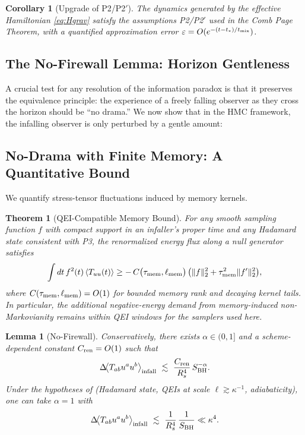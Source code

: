 \documentclass[a4paper,11pt]{article}
\newcommand{\HMC}{\textsc{HMC}\xspace}
\theoremstyle{plain}
\newtheorem{theorem}{Theorem}
\newtheorem{lemma}{Lemma}
\newtheorem{corollary}{Corollary}
\theoremstyle{definition}
\theoremstyle{remark}
\begin{document}
\begin{corollary}[Upgrade of P2/P2$'$]
\label{cor:p2-upgrade}
The dynamics generated by the effective Hamiltonian \eqref{eq:Hgrav} satisfy the assumptions P2/P2$'$ used in the Comb Page Theorem, with a quantified approximation error $\varepsilon=O(e^{-(t-t_\ast)/t_{\rm mix}})$.
\end{corollary}

\subsection{The No-Firewall Lemma: Horizon Gentleness}
\label{sec:no_firewall}
A crucial test for any resolution of the information paradox is that it preserves the equivalence principle: the experience of a freely falling observer as they cross the horizon should be ``no drama.'' We now show that in the \HMC{} framework, the infalling observer is only perturbed by a gentle amount:

\subsection{No-Drama with Finite Memory: A Quantitative Bound}
We quantify stress-tensor fluctuations induced by memory kernels.

\begin{theorem}[QEI-Compatible Memory Bound]\label{thm:qei-memory}
For any smooth sampling function $f$ with compact support in an infaller's proper time and any Hadamard state consistent with P3, the renormalized energy flux along a null generator satisfies
\begin{align}
\int dt\, f^2(t)\,\langle T_{uu}(t)\rangle \ge -\,C\big(\tau_{\rm mem},\ell_{\rm mem}\big)\,\big(\|f\|_2^2 + \tau_{\rm mem}^2 \|f'\|_2^2\big),
\end{align}
where $C(\tau_{\rm mem},\ell_{\rm mem})=O(1)$ for bounded memory rank and decaying kernel tails. In particular, the additional negative-energy demand from memory-induced non-Markovianity remains within QEI windows for the samplers used here. 
\end{theorem}



\begin{lemma}[No-Firewall]\label{lem:nofirewall}
Conservatively, there exists $\alpha\in(0,1]$ and a scheme-dependent constant $C_{\rm ren}=O(1)$ such that
\begin{equation}
    \Delta\!\big\langle T_{ab} u^a u^b \big\rangle_{\rm infall} \ \lesssim\ \frac{C_{\rm ren}}{R_s^4}\,S_{\rm BH}^{-\alpha}.
\end{equation}
Under the hypotheses of  (Hadamard state, QEIs at scale $\ell\!\gtrsim\!\kappa^{-1}$, adiabaticity),
one can take $\alpha=1$ with
\begin{equation}
    \Delta\!\big\langle T_{ab} u^a u^b \big\rangle_{\rm infall} \ \lesssim\ \frac{1}{R_s^4}\,\frac{1}{S_{\rm BH}} \ll \kappa^4.
    \label{eq:gentleness}
\end{equation}
\end{lemma}
\end{document}
